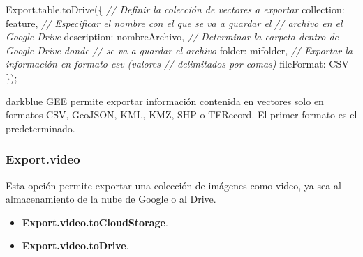 \documentclass[
  12pt,
  letterpaper,
  twoside]{book}
\newenvironment{Shaded}{\begin{snugshade}}{\end{snugshade}}
\newcommand{\AttributeTok}[1]{\textcolor[rgb]{0.48,0.12,0.64}{#1}}
\newcommand{\CommentTok}[1]{\textcolor[rgb]{0.24,0.58,0.00}{\textit{#1}}}
\newcommand{\DataTypeTok}[1]{\textcolor[rgb]{0.00,0.00,0.00}{#1}}
\newcommand{\FunctionTok}[1]{\textcolor[rgb]{0.48,0.12,0.64}{#1}}
\newcommand{\NormalTok}[1]{#1}
\newcommand{\OperatorTok}[1]{\textcolor[rgb]{0.00,0.00,0.00}{#1}}
\newcommand{\StringTok}[1]{\textcolor[rgb]{0.87,0.29,0.22}{#1}}
\providecommand{\tightlist}{%
  \setlength{\itemsep}{0pt}\setlength{\parskip}{0pt}}
\newcommand\boldpurple[1]{\textcolor{darkpurple}{\textbf{#1}}}
\begin{document}
\begin{Shaded}
\begin{Highlighting}[]
\NormalTok{Export}\OperatorTok{.}\AttributeTok{table}\OperatorTok{.}\FunctionTok{toDrive}\NormalTok{(\{}
  \CommentTok{// Definir la colección de vectores a exportar}
  \DataTypeTok{collection}\OperatorTok{:}\NormalTok{ feature}\OperatorTok{,}
  \CommentTok{// Especificar el nombre con el que se va a guardar el }
  \CommentTok{// archivo en el Google Drive}
  \DataTypeTok{description}\OperatorTok{:} \StringTok{\textquotesingle{}nombreArchivo\textquotesingle{}}\OperatorTok{,}
  \CommentTok{// Determinar la carpeta dentro de Google Drive donde}
  \CommentTok{// se va a guardar el archivo}
  \DataTypeTok{folder}\OperatorTok{:} \StringTok{\textquotesingle{}mifolder\textquotesingle{}}\OperatorTok{,}
  \CommentTok{// Exportar la información en formato csv (valores }
  \CommentTok{// delimitados por comas)}
  \DataTypeTok{fileFormat}\OperatorTok{:} \StringTok{\textquotesingle{}CSV\textquotesingle{}}
\NormalTok{\})}\OperatorTok{;}
\end{Highlighting}
\end{Shaded}

\begin{bluebox2}

\begin{awesomeblock}{5pt}{\faLightbulb}{darkblue}
GEE permite exportar información contenida en vectores solo en formatos CSV, GeoJSON, KML, KMZ, SHP o TFRecord. El primer formato es el predeterminado.

\end{awesomeblock}

\end{bluebox2}

\hypertarget{export.video}{%
\subsubsection*{Export.video}\label{export.video}}

Esta opción permite exportar una colección de imágenes como video, ya sea al almacenamiento de la nube de Google o al Drive.

\begin{itemize}
\tightlist
\item
  \boldpurple{Export.video.toCloudStorage}.
\item
  \boldpurple{Export.video.toDrive}.
\end{itemize}
\end{document}
